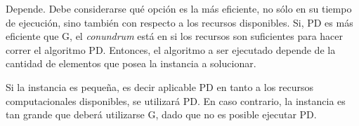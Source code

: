 \documentclass[../tp2_grupo404.tex]{subfiles}
\begin{document}
Depende. Debe considerarse qué opción es la más eficiente, no sólo
en su tiempo de ejecución, sino también con respecto a los recursos
disponibles. Si, PD es más eficiente que G, el \emph{conundrum} está
en si los recursos son suficientes para hacer correr el algoritmo PD.
Entonces, el algoritmo a ser ejecutado depende de la cantidad de
elementos que posea la instancia a solucionar.

Si la instancia es pequeña, es decir aplicable PD en tanto a los
recursos computacionales disponibles, se utilizará PD. En caso
contrario, la instancia es tan grande que deberá utilizarse G, dado
que no es posible ejecutar PD.

\end{document}
